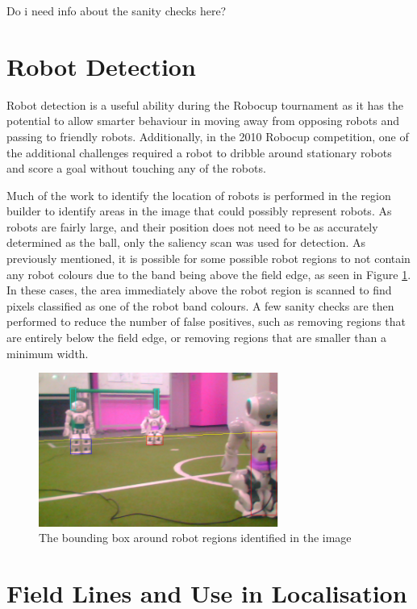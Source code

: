 \documentclass[runningheads,a4paper]{llncs}
\begin{document}
Do i need info about the sanity checks here?

\section{Robot Detection}

Robot detection is a useful ability during the Robocup tournament as it has the potential to allow smarter behaviour in moving away from opposing robots and passing to friendly robots. Additionally, in the 2010 Robocup competition, one of the additional challenges required a robot to dribble around stationary robots and score a goal without touching any of the robots.

Much of the work to identify the location of robots is performed in the region builder to identify areas in the image that could possibly represent robots. As robots are fairly large, and their position does not need to be as accurately determined as the ball, only the saliency scan was used for detection. As previously mentioned, it is possible for some possible robot regions to not contain any robot colours due to the band being above the field edge, as seen in Figure \ref{fig:robotDetection}. In these cases, the area immediately above the robot region is scanned to find pixels classified as one of the robot band colours. A few sanity checks are then performed to reduce the number of false positives, such as removing regions that are entirely below the field edge, or removing regions that are smaller than a minimum width.

\begin{figure} [t]
\centering
\includegraphics[width=0.7\textwidth]{figures/robotDetectionScreenshot.png}
\caption{The bounding box around robot regions identified in the image} \label{fig:robotDetection}
\end{figure}

\section{Field Lines and Use in Localisation}
\end{document}
